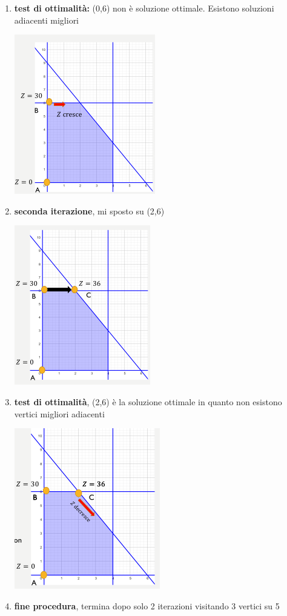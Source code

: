 \documentclass[a4paper,12pt, oneside]{book}
\begin{document}
\begin{enumerate}
\begin{center}
  \end{center}
  \item \textbf{test di ottimalità:} (0,6) non è soluzione ottimale.
  Esistono soluzioni adiacenti migliori
  \begin{center}
    \includegraphics[scale = 0.8]{img/simp11.png}
  \end{center}
  \item \textbf{seconda iterazione}, mi sposto su (2,6)
  \begin{center}
    \includegraphics[scale = 0.8]{img/simp12.png}
  \end{center}
  \item \textbf{test di ottimalità}, (2,6) è la soluzione ottimale in
  quanto non esistono vertici migliori adiacenti
  \begin{center}
    \includegraphics[scale = 0.8]{img/simp13.png}
  \end{center}
  \item \textbf{fine procedura}, termina dopo solo 2 iterazioni
  visitando 3 vertici su 5
\end{enumerate}
\end{document}
